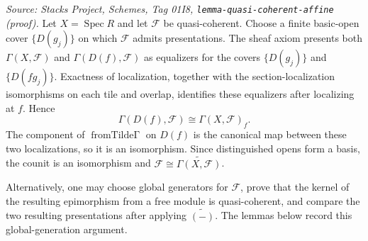 \begin{remark}
  \label{rem:o1i8_decomposition}
  \textit{Source: Stacks Project, Schemes, Tag 01I8, \texttt{lemma-quasi-coherent-affine}
  (proof).}
  Let \(X=\operatorname{Spec}R\) and let \(\mathcal F\) be quasi-coherent. Choose a
  finite basic-open cover \(\{D(g_j)\}\) on which \(\mathcal F\) admits presentations.
  The sheaf axiom presents both \(\Gamma(X,\mathcal F)\) and
  \(\Gamma(D(f),\mathcal F)\) as equalizers for the covers \(\{D(g_j)\}\) and
  \(\{D(fg_j)\}\). Exactness of localization, together with the section-localization
  isomorphisms on each tile and overlap, identifies these equalizers after localizing
  at \(f\). Hence
  \[
    \Gamma(D(f),\mathcal F)\cong\Gamma(X,\mathcal F)_f.
  \]
  The component of \(\operatorname{fromTilde\Gamma}\) on \(D(f)\) is the canonical map
  between these two localizations, so it is an isomorphism. Since distinguished opens
  form a basis, the counit is an isomorphism and
  \(\mathcal F\cong\widetilde{\Gamma(X,\mathcal F)}\).

  Alternatively, one may choose global generators for \(\mathcal F\), prove that the
  kernel of the resulting epimorphism from a free module is quasi-coherent, and compare
  the two resulting presentations after applying \(\widetilde{(-)}\). The lemmas below
  record this global-generation argument.
\end{remark}

